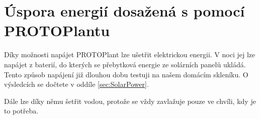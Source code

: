 \chapter{Úspora energií dosažená s pomocí PROTOPlantu}
Díky možnosti napájet PROTOPlant  lze ušetřit elektrickou energii. 
V noci jej lze napájet z baterií, do kterých se přebytková energie ze solárních panelů ukládá.
Tento způsob napájení již dlouhou dobu testuji na našem domácím skleníku. 
O výsledcích se dočtete v oddíle \ref{sec:SolarPower}.

Dále lze díky němu šetřit vodou, protože se vždy zavlažuje pouze ve chvíli, kdy je to potřeba.

\newpage